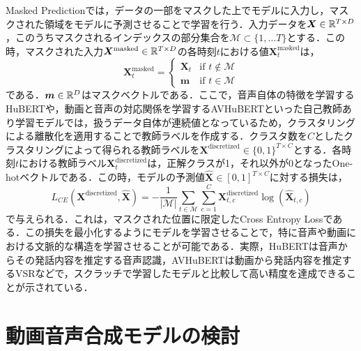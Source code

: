 \documentclass[12pt]{jarticle}
\numberwithin{equation}{section}    %
\numberwithin{figure}{section}      %
\numberwithin{table}{section}      %
\begin{document}
Masked Predictionでは，データの一部をマスクした上でモデルに入力し，マスクされた領域をモデルに予測させることで学習を行う．入力データを$\bm{X} \in \mathbb{R}^{T \times D}$，このうちマスクされるインデックスの部分集合を$\mathcal{M} \subset \{ 1, \ldots T \}$とする．この時，マスクされた入力$\bm{X}^{\text{masked}} \in \mathbb{R}^{T \times D}$の各時刻$t$における値$\bm{X}^{\text{masked}}_{t}$は，
\begin{equation}
    \bm{X}^{\text{masked}}_{t} =
    \begin{cases}
        \bm{X}_{t} & \text{if $t \notin \mathcal{M}$} \\
        \bm{m}     & \text{if $t \in \mathcal{M}$}
    \end{cases}
\end{equation}
である．$\bm{m} \in \mathbb{R}^{D}$はマスクベクトルである．ここで，音声自体の特徴を学習するHuBERT\cite{hsu2021hubert}や，動画と音声の対応関係を学習するAVHuBERT\cite{shi2022learning}といった自己教師あり学習モデルでは，扱うデータ自体が連続値となっているため，クラスタリングによる離散化を適用することで教師ラベルを作成する．クラスタ数を$C$としたクラスタリングによって得られる教師ラベルを$\bm{X}^{\text{discretized}} \in \{0, 1\}^{T \times C}$とする．各時刻$t$における教師ラベル$\bm{X}^{\text{discretized}}_{t}$は，正解クラスが1，それ以外が0となったOne-hotベクトルである．この時，モデルの予測値$\hat{\bm{X}} \in [0, 1]^{T \times C}$に対する損失は，
\begin{equation}
    L_{CE}(\bm{X}^{\text{discretized}}, \hat{\bm{X}}) =
    - \frac{1}{|\mathcal{M}|} \sum_{t \in \mathcal{M}} \sum_{c = 1}^{C} \bm{X}^{\text{discretized}}_{t, c} \log (\hat{\bm{X}}_{t, c})
\end{equation}
で与えられる．これは，マスクされた位置に限定したCross Entropy Lossである．この損失を最小化するようにモデルを学習させることで，特に音声や動画における文脈的な構造を学習させることが可能である．実際，HuBERTは音声からその発話内容を推定する音声認識，AVHuBERTは動画から発話内容を推定するVSRなどで，スクラッチで学習したモデルと比較して高い精度を達成できることが示されている．

\clearpage

\section{動画音声合成モデルの検討}
\end{document}
